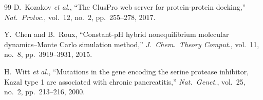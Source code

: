 \documentclass[conference]{IEEEtran}
\begin{document}
\begin{thebibliography}{99}
D.~Kozakov \textit{et al.},
``The ClusPro web server for protein-protein docking,''
\textit{Nat.\ Protoc.}, vol.~12, no.~2, pp.~255--278, 2017.

Y.~Chen and B.~Roux,
``Constant-pH hybrid nonequilibrium molecular dynamics--Monte Carlo
simulation method,''
\textit{J.\ Chem.\ Theory Comput.}, vol.~11, no.~8, pp.~3919--3931, 2015.

H.~Witt \textit{et al.},
``Mutations in the gene encoding the serine protease inhibitor, Kazal
type 1 are associated with chronic pancreatitis,''
\textit{Nat.\ Genet.}, vol.~25, no.~2, pp.~213--216, 2000.

\end{thebibliography}
\end{document}
